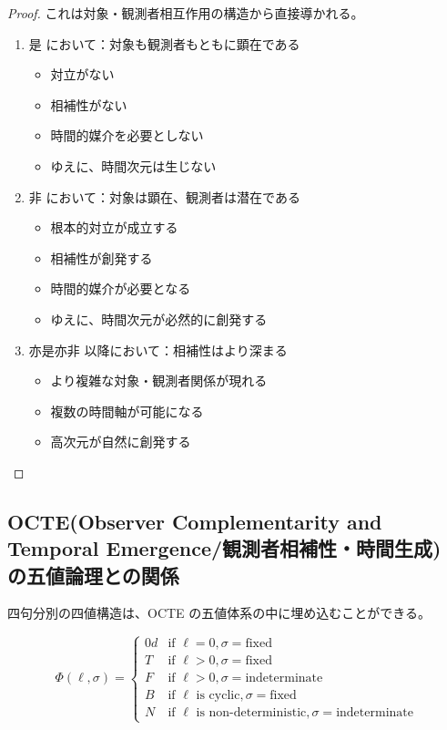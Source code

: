 \documentclass[12pt,a4paper]{article}
\theoremstyle{definition}
\begin{document}
\begin{proof}
これは対象・観測者相互作用の構造から直接導かれる。
\begin{enumerate}
    \item 是 において：対象も観測者もともに顕在である
    \begin{itemize}
        \item 対立がない
        \item 相補性がない
        \item 時間的媒介を必要としない
        \item ゆえに、時間次元は生じない
    \end{itemize}

    \item 非 において：対象は顕在、観測者は潜在である
    \begin{itemize}
        \item 根本的対立が成立する
        \item 相補性が創発する
        \item 時間的媒介が必要となる
        \item ゆえに、時間次元が必然的に創発する
    \end{itemize}

    \item 亦是亦非 以降において：相補性はより深まる
    \begin{itemize}
        \item より複雑な対象・観測者関係が現れる
        \item 複数の時間軸が可能になる
        \item 高次元が自然に創発する
    \end{itemize}
\end{enumerate}
\end{proof}

\subsection{OCTE(Observer Complementarity and Temporal Emergence/観測者相補性・時間生成) の五値論理との関係}

四句分別の四値構造は、OCTE の五値体系の中に埋め込むことができる。

\begin{equation}
\Phi(\ell, \sigma) =
\begin{cases}
0d & \text{if } \ell = 0, \sigma = \text{fixed} \\
T & \text{if } \ell > 0, \sigma = \text{fixed} \\
F & \text{if } \ell > 0, \sigma = \text{indeterminate} \\
B & \text{if } \ell \text{ is cyclic}, \sigma = \text{fixed} \\
N & \text{if } \ell \text{ is non-deterministic}, \sigma = \text{indeterminate}
\end{cases}
\end{equation}
\end{document}
